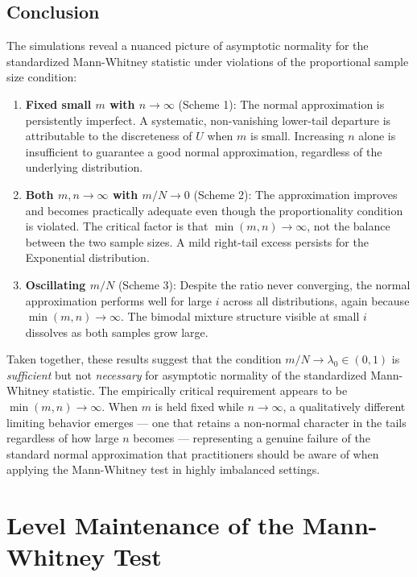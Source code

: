 \documentclass[10pt]{article}
\begin{document}
\subsection{Conclusion}

The simulations reveal a nuanced picture of asymptotic normality for the standardized Mann-Whitney statistic under violations of the proportional sample size condition:

\begin{enumerate}
    \item \textbf{Fixed small $m$ with $n \to \infty$} (Scheme 1): The normal approximation is persistently imperfect. A systematic, non-vanishing lower-tail departure is attributable to the discreteness of $U$ when $m$ is small. Increasing $n$ alone is insufficient to guarantee a good normal approximation, regardless of the underlying distribution.

    \item \textbf{Both $m, n \to \infty$ with $m/N \to 0$} (Scheme 2): The approximation improves and becomes practically adequate even though the proportionality condition is violated. The critical factor is that $\min(m, n) \to \infty$, not the balance between the two sample sizes. A mild right-tail excess persists for the Exponential distribution.

    \item \textbf{Oscillating $m/N$} (Scheme 3): Despite the ratio never converging, the normal approximation performs well for large $i$ across all distributions, again because $\min(m,n) \to \infty$. The bimodal mixture structure visible at small $i$ dissolves as both samples grow large.
\end{enumerate}

Taken together, these results suggest that the condition $m/N \to \lambda_0 \in (0,1)$ is \emph{sufficient} but not \emph{necessary} for asymptotic normality of the standardized Mann-Whitney statistic. The empirically critical requirement appears to be $\min(m, n) \to \infty$. When $m$ is held fixed while $n \to \infty$, a qualitatively different limiting behavior emerges --- one that retains a non-normal character in the tails regardless of how large $n$ becomes --- representing a genuine failure of the standard normal approximation that practitioners should be aware of when applying the Mann-Whitney test in highly imbalanced settings.

\section{Level Maintenance of the Mann-Whitney Test}
\end{document}
